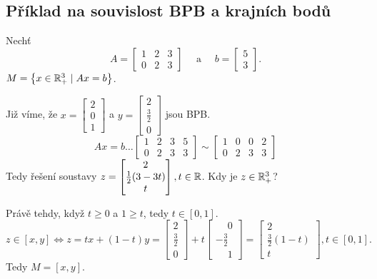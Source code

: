 \subsection{Příklad na souvislost BPB a krajních bodů}
Nechť
\[
    A =
    \begin{bmatrix}
    1 & 2 & 3 \\
    0 & 2 & 3
    \end{bmatrix} \quad \text{ a } \quad b =
    \begin{bmatrix}
        5 \\
        3
    \end{bmatrix}.
\]
$M = \left\lbrace x \in \mathbb{R}^3_+ \mid Ax = b \right\rbrace$.

Již víme, že $x =
\begin{bmatrix} 
    2 \\ 0 \\ 1 
\end{bmatrix}$ a $y =
\begin{bmatrix}
    2 \\ \frac{3}{2} \\ 0
\end{bmatrix}$ jsou BPB.
\[
    Ax = b \dots
    \left[
        \begin{array}{ccc|c}
        1 & 2 & 3 & 5 \\
        0 & 2 & 3 & 3
        \end{array}
    \right] \sim
    \left[
        \begin{array}{ccc|c}
        1 & 0 & 0 & 2 \\
        0 & 2 & 3 & 3
        \end{array}
    \right]
\]
Tedy řešení soustavy $z =
\begin{bmatrix}
    2 \\ \frac{1}{2}(3-3t) \\ t
\end{bmatrix}, t \in \mathbb{R}$. Kdy je $z \in \mathbb{R}^3_+$?

Právě tehdy, když $t \geq 0$ a $1\geq t$, tedy $t \in [0,1]$.
\[
    z \in [x, y] \iff z = tx + (1-t)y =
    \begin{bmatrix}
        2 \\
        \frac{3}{2} \\
        0
    \end{bmatrix} + t
    \begin{bmatrix}
        \phantom{-}0 \\
        -\frac{3}{2} \\
        \phantom{-}1
    \end{bmatrix} =
    \begin{bmatrix}
        2 \\
        \frac{3}{2} (1-t) \\
        t
    \end{bmatrix}, t \in [0,1].
\]
Tedy $M = [x, y]$.

